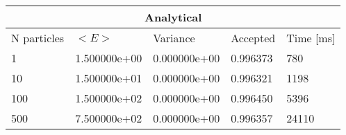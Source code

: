 \begin{tabular}{|l|l|l|l|l|}
\hline 
\multicolumn{5}{|c|}{Analytical}\\ 
\hline 
N particles & $<E>$ & Variance & Accepted & Time [ms]\\ 
 \hline 
1 & 1.500000e+00 & 0.000000e+00 & 0.996373 & 780 \\ 
\hline10 & 1.500000e+01 & 0.000000e+00 & 0.996321 & 1198 \\ 
\hline100 & 1.500000e+02 & 0.000000e+00 & 0.996450 & 5396 \\ 
\hline500 & 7.500000e+02 & 0.000000e+00 & 0.996357 & 24110 \\ 
\hline\end{tabular}